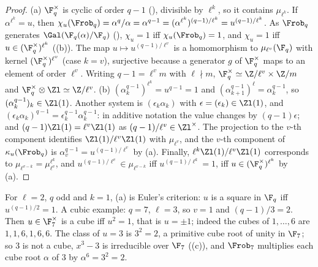 \begin{proof}
(a) $\F_q^\times$ is cyclic of order $q-1$ (), divisible by $\ell^k$, so it contains $\mu_{\ell^k}$. If $\alpha^{\ell^k}=u$, then
$\chi_u(\Frob_q)=\alpha^q/\alpha=\alpha^{q-1}=(\alpha^{\ell^k})^{(q-1)/\ell^k}=u^{(q-1)/\ell^k}$. As $\Frob_q$ generates $\Gal(\F_q(\alpha)/\F_q)$
(), $\chi_u=1$ iff $\chi_u(\Frob_q)=1$, and $\chi_u=1$ iff $u\in(\F_q^\times)^{\ell^k}$ ((b)). The map
$u\mapsto u^{(q-1)/\ell^v}$ is a homomorphism to $\mu_{\ell^v}(\F_q)$ with kernel $(\F_q^\times)^{\ell^v}$ (case $k=v$), surjective because a generator $g$ of $\F_q^\times$
maps to an element of order $\ell^v$. Writing $q-1=\ell^vm$ with $\ell\nmid m$, $\F_q^\times\simeq\Z/\ell^v\times\Z/m$ and $\F_q^\times\otimes\Zl\simeq\Z/\ell^v$.
(b) $(\alpha_k^{q-1})^{\ell^k}=u^{q-1}=1$ and $(\alpha_{k+1}^{q-1})^\ell=\alpha_k^{q-1}$, so $(\alpha_k^{q-1})_k\in\Zl(1)$. Another system is $(\epsilon_k\alpha_k)$ with
$\epsilon=(\epsilon_k)\in\Zl(1)$, and $(\epsilon_k\alpha_k)^{q-1}=\epsilon_k^{q-1}\alpha_k^{q-1}$: in additive notation the value changes by $(q-1)\epsilon$; and
$(q-1)\Zl(1)=\ell^v\Zl(1)$ as $(q-1)/\ell^v\in\Zl^\times$. The projection to the $v$-th component identifies $\Zl(1)/\ell^v\Zl(1)$ with $\mu_{\ell^v}$, and the $v$-th
component of $\kappa_u(\Frob_q)$ is $\alpha_v^{q-1}=u^{(q-1)/\ell^v}$ by (a). Finally, $\ell^k\Zl(1)/\ell^v\Zl(1)$ corresponds to $\mu_{\ell^{v-k}}=\mu_{\ell^v}^{\ell^k}$, and
$u^{(q-1)/\ell^v}\in\mu_{\ell^{v-k}}$ iff $u^{(q-1)/\ell^k}=1$, iff $u\in(\F_q^\times)^{\ell^k}$ by (a).
\end{proof}

For $\ell=2$, $q$ odd and $k=1$, (a) is Euler's criterion: $u$ is a square in $\F_q$ iff $u^{(q-1)/2}=1$. A cubic example: $q=7$, $\ell=3$, so $v=1$ and
$(q-1)/3=2$. Then $u\in\F_7^\times$ is a cube iff $u^2=1$, that is $u=\pm1$; indeed the cubes of $1,\dots,6$ are $1,1,6,1,6,6$. The class of $u=3$ is $3^2=2$, a
primitive cube root of unity in $\F_7$; so $3$ is not a cube, $x^3-3$ is irreducible over $\F_7$ ((c)), and $\Frob_7$ multiplies
each cube root $\alpha$ of $3$ by $\alpha^6=3^2=2$.

